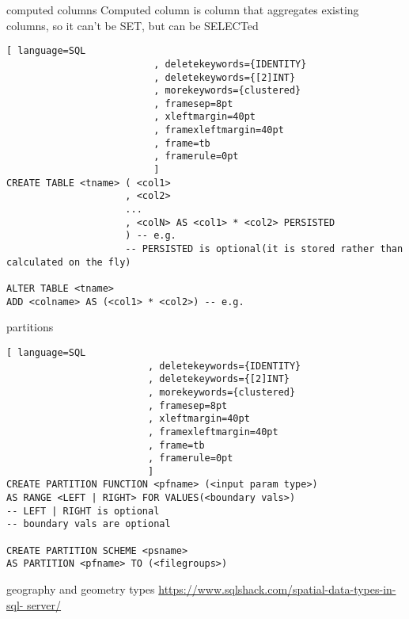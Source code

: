 \documentclass{article}
\begin{document}
    \begin{section}{computed columns}
        Computed column is column that aggregates existing columns, so it can't be SET, but can be SELECTed
        \begin{lstlisting}[ language=SQL
                          , deletekeywords={IDENTITY}
                          , deletekeywords={[2]INT}
                          , morekeywords={clustered}
                          , framesep=8pt
                          , xleftmargin=40pt
                          , framexleftmargin=40pt
                          , frame=tb
                          , framerule=0pt 
                          ]
CREATE TABLE <tname> ( <col1>
                     , <col2>
                     ...
                     , <colN> AS <col1> * <col2> PERSISTED
                     ) -- e.g.
                     -- PERSISTED is optional(it is stored rather than calculated on the fly)

ALTER TABLE <tname>
ADD <colname> AS (<col1> * <col2>) -- e.g.
        \end{lstlisting}
    \end{section}
    \begin{section}{partitions}
        \begin{lstlisting}[ language=SQL
                         , deletekeywords={IDENTITY}
                         , deletekeywords={[2]INT}
                         , morekeywords={clustered}
                         , framesep=8pt
                         , xleftmargin=40pt
                         , framexleftmargin=40pt
                         , frame=tb
                         , framerule=0pt 
                         ]
CREATE PARTITION FUNCTION <pfname> (<input param type>)
AS RANGE <LEFT | RIGHT> FOR VALUES(<boundary vals>)
-- LEFT | RIGHT is optional    
-- boundary vals are optional

CREATE PARTITION SCHEME <psname>
AS PARTITION <pfname> TO (<filegroups>)
        \end{lstlisting}
    \end{section}
    \begin{section}{geography and geometry types}
        \url{https://www.sqlshack.com/spatial-data-types-in-sql-
        server/}
    \end{section}
\end{document}

